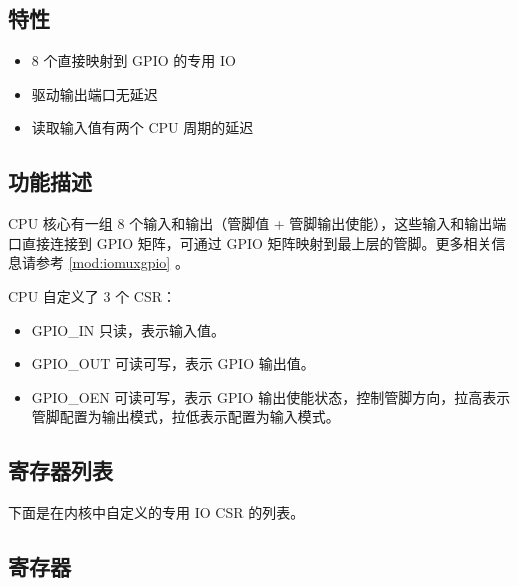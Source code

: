\documentclass[main\_\_CN.tex]{subfiles}
\begin{document}
\subsection{特性}
\label{sec:riscvcpu-fastio-features}
 \begin{itemize}
    \item 8 个直接映射到 GPIO 的专用 IO
    \item 驱动输出端口无延迟
    \item 读取输入值有两个 CPU 周期的延迟
\end{itemize}

\subsection{功能描述}
\label{sec:riscvcpu-fastio-func-descr}

CPU 核心有一组 8 个输入和输出（管脚值 + 管脚输出使能），这些输入和输出端口直接连接到 GPIO 矩阵，可通过 GPIO 矩阵映射到最上层的管脚。更多相关信息请参考 \ref{mod:iomuxgpio} \textit{}。

CPU 自定义了 3 个 CSR：
\begin{itemize}
    \item GPIO\_IN 只读，表示输入值。
    \item GPIO\_OUT 可读可写，表示 GPIO 输出值。
    \item GPIO\_OEN 可读可写，表示 GPIO 输出使能状态，控制管脚方向，拉高表示管脚配置为输出模式，拉低表示配置为输入模式。
\end{itemize}


\clearpage
\hypertarget{riscvcpu-fastio-reg-summ}{}
\subsection{寄存器列表}
\label{sec:riscvcpu-fastio-reg-summ}

下面是在内核中自定义的专用 IO CSR 的列表。




\subsection{寄存器}
\label{sec:riscvcpu-fastio-reg-desc}

\end{document}
